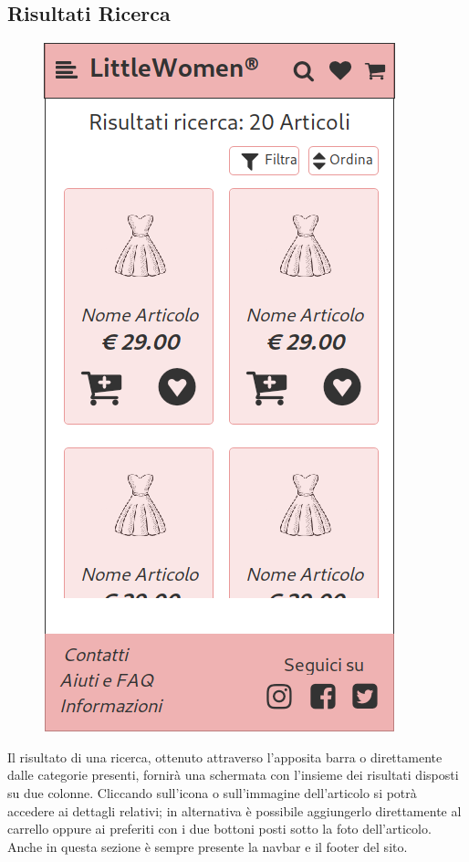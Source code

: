 \documentclass[12pt,a4paper]{report}
\begin{document}
\subsection{Risultati Ricerca}
\begin{figure}
\centering
\includegraphics[height=0.4\textheight]{"Project Management Sources/Wireframe/WireFrame Screenshot/Mobile/Risultati ricerca"}
\vspace{-100pt}
\end{figure}
Il risultato di una ricerca, ottenuto attraverso l'apposita barra o direttamente dalle categorie presenti, fornirà una schermata con l'insieme dei risultati disposti su due colonne. Cliccando sull'icona o sull'immagine dell'articolo si potrà accedere ai dettagli relativi; in alternativa è possibile aggiungerlo direttamente al carrello oppure ai preferiti con i due bottoni posti sotto la foto dell'articolo. Anche in questa sezione è sempre presente la navbar e il footer del sito.\\
\end{document}
